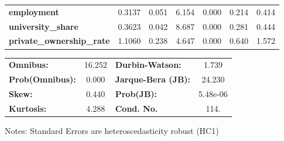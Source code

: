 \begin{center}
\begin{tabular}{lcccccc}
\textbf{employment}               &       0.3137  &        0.051     &     6.154  &         0.000        &        0.214    &        0.414     \\
\textbf{university\_share}        &       0.3623  &        0.042     &     8.687  &         0.000        &        0.281    &        0.444     \\
\textbf{private\_ownership\_rate} &       1.1060  &        0.238     &     4.647  &         0.000        &        0.640    &        1.572     \\
\bottomrule
\end{tabular}
\begin{tabular}{lclc}
\textbf{Omnibus:}       & 16.252 & \textbf{  Durbin-Watson:     } &    1.739  \\
\textbf{Prob(Omnibus):} &  0.000 & \textbf{  Jarque-Bera (JB):  } &   24.230  \\
\textbf{Skew:}          &  0.440 & \textbf{  Prob(JB):          } & 5.48e-06  \\
\textbf{Kurtosis:}      &  4.288 & \textbf{  Cond. No.          } &     114.  \\
\bottomrule
\end{tabular}
\end{center}

Notes: \newline
 [1] Standard Errors are heteroscedasticity robust (HC1)